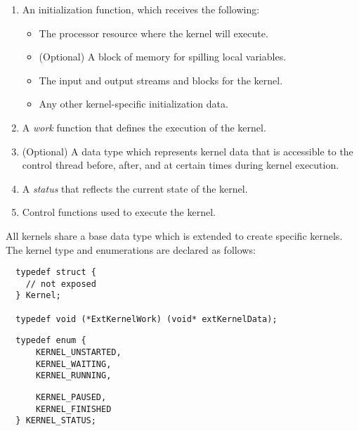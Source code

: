 \begin{enumerate}

\item An initialization function, which receives the following: 
\begin{itemize}
\item The processor resource where the kernel will execute. 
\item (Optional) A block of memory for spilling local variables. 
\item The input and output streams and blocks for the kernel. 
\item Any other kernel-specific initialization data. 
\end{itemize}

\item A {\it work} function that defines the execution of the kernel.

\item (Optional) A data type which represents kernel data that is
accessible to the control thread before, after, and at certain times
during kernel execution.

\item A {\it status} that reflects the current state of the kernel.

\item Control functions used to execute the kernel.

\end{enumerate}


All kernels share a base data type which is extended to create
specific kernels. The kernel type and enumerations are declared as
follows:

{\small
\begin{verbatim}
  typedef struct {
    // not exposed
  } Kernel;

  typedef void (*ExtKernelWork) (void* extKernelData);
\end{verbatim}}
{\small
\begin{verbatim}
  typedef enum {
      KERNEL_UNSTARTED,
      KERNEL_WAITING,
      KERNEL_RUNNING,
\end{verbatim}}
{\small
\begin{verbatim}
      KERNEL_PAUSED,
      KERNEL_FINISHED
  } KERNEL_STATUS;
\end{verbatim}}

